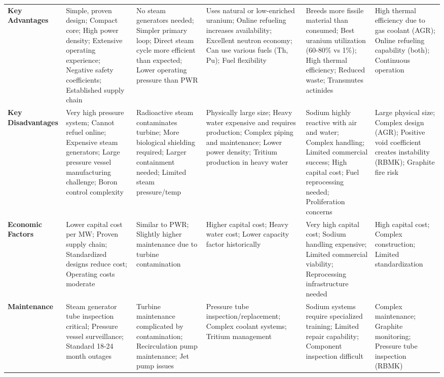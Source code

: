 \documentclass{article}
\begin{document}
\begin{longtable}{>{\raggedright\arraybackslash}p{3.5cm}*{5}{>{\raggedright\arraybackslash}p{3.2cm}}}
\multicolumn{6}{l}{\textbf{\Large Advantages \& Disadvantages}} \\
\midrule

\textbf{Key Advantages} & Simple, proven design; Compact core; High power density; Extensive operating experience; Negative safety coefficients; Established supply chain & No steam generators needed; Simpler primary loop; Direct steam cycle more efficient than expected; Lower operating pressure than PWR & Uses natural or low-enriched uranium; Online refueling increases availability; Excellent neutron economy; Can use various fuels (Th, Pu); Fuel flexibility & Breeds more fissile material than consumed; Best uranium utilization (60-80\% vs 1\%); High thermal efficiency; Reduced waste; Transmutes actinides & High thermal efficiency due to gas coolant (AGR); Online refueling capability (both); Continuous operation \\
\midrule

\textbf{Key Disadvantages} & Very high pressure system; Cannot refuel online; Expensive steam generators; Large pressure vessel manufacturing challenge; Boron control complexity & Radioactive steam contaminates turbine; More biological shielding required; Larger containment needed; Limited steam pressure/temp & Physically large size; Heavy water expensive and requires production; Complex piping and maintenance; Lower power density; Tritium production in heavy water & Sodium highly reactive with air and water; Complex handling; Limited commercial success; High capital cost; Fuel reprocessing needed; Proliferation concerns & Large physical size; Complex design (AGR); Positive void coefficient creates instability (RBMK); Graphite fire risk \\
\midrule

\textbf{Economic Factors} & Lower capital cost per MW; Proven supply chain; Standardized designs reduce cost; Operating costs moderate & Similar to PWR; Slightly higher maintenance due to turbine contamination & Higher capital cost; Heavy water cost; Lower capacity factor historically & Very high capital cost; Sodium handling expensive; Limited commercial viability; Reprocessing infrastructure needed & High capital cost; Complex construction; Limited standardization \\
\midrule

\textbf{Maintenance} & Steam generator tube inspection critical; Pressure vessel surveillance; Standard 18-24 month outages & Turbine maintenance complicated by contamination; Recirculation pump maintenance; Jet pump issues & Pressure tube inspection/replacement; Complex coolant systems; Tritium management & Sodium systems require specialized training; Limited repair capability; Component inspection difficult & Complex maintenance; Graphite monitoring; Pressure tube inspection (RBMK) \\
\midrule


\end{longtable}
\end{document}
